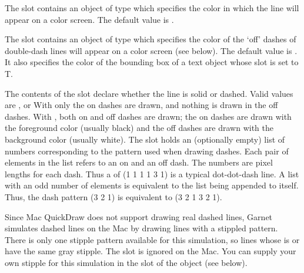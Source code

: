 \vspace{1 line}
\begin{group}
The  slot contains an object of type
 which specifies the color in which the line will appear
on a color screen.  The default value is .

The  slot contains an object of type
 which specifies the color of the `off' dashes of
double-dash lines will appear on a color screen (see below).
The default value is .  It also specifies the color
of the bounding box of a text object whose 
slot is set to T.
\end{group}
\vspace{1 line}
\begin{group}
The contents of the  slot declare whether the line is solid
or dashed. Valid values are ,  or  With
 only the on dashes are drawn, and nothing is drawn in the off
dashes.  With , both on and off dashes are drawn; the
on dashes are drawn with the foreground color (usually black) and the
off dashes are drawn with the background color (usually white).
\vspace{1 line}
The  slot holds an (optionally empty) list of numbers
corresponding to the pattern used when drawing dashes.  Each pair of
elements in the list refers to an on and an off dash.  The numbers are
pixel lengths for each dash.  Thus a  of {\obeyspaces (1 1 1 1 3 1)} is
a typical dot-dot-dash line.  A list with an odd number of elements is
equivalent to the list being appended to itself.  Thus, the dash pattern
{\obeyspaces (3 2 1)} is equivalent to {\obeyspaces (3 2 1 3 2 1)}.
\end{group}
\vspace{1 line}

Since Mac QuickDraw does not support drawing real dashed lines, Garnet
simulates dashed lines on the Mac by drawing lines with a stippled pattern.
There is only one stipple pattern available for this simulation, so lines
whose  is  or  have the same
gray stipple.  The  slot is ignored on the Mac.
You can supply your own stipple for this simulation in the 
slot of the  object (see below).

